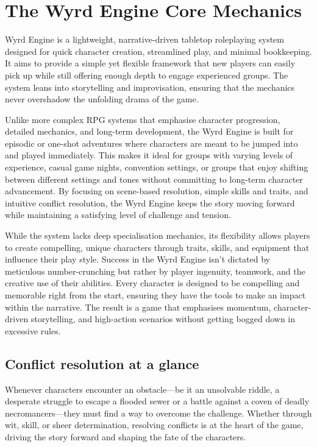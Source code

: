 \chapter{The Wyrd Engine Core Mechanics}

 Wyrd Engine is a lightweight, narrative-driven tabletop roleplaying system designed for quick character creation, streamlined play, and minimal bookkeeping. It aims to provide a simple yet flexible framework that new players can easily pick up while still offering enough depth to engage experienced groups. The system leans into storytelling and improvisation, ensuring that the mechanics never overshadow the unfolding drama of the game.

Unlike more complex RPG systems that emphasise character progression, detailed mechanics, and long-term development, the Wyrd Engine is built for episodic or one-shot adventures where characters are meant to be jumped into and played immediately. This makes it ideal for groups with varying levels of experience, casual game nights, convention settings, or groups that enjoy shifting between different settings and tones without committing to long-term character advancement. By focusing on scene-based resolution, simple skills and traits, and intuitive conflict resolution, the Wyrd Engine keeps the story moving forward while maintaining a satisfying level of challenge and tension.

While the system lacks deep specialisation mechanics, its flexibility allows players to create compelling, unique characters through traits, skills, and equipment that influence their play style. Success in the Wyrd Engine isn’t dictated by meticulous number-crunching but rather by player ingenuity, teamwork, and the creative use of their abilities. Every character is designed to be compelling and memorable right from the start, ensuring they have the tools to make an impact within the narrative. The result is a game that emphasises momentum, character-driven storytelling, and high-action scenarios without getting bogged down in excessive rules.

\section{Conflict resolution at a glance}

Whenever characters encounter an obstacle—be it an unsolvable riddle, a desperate struggle to escape a flooded sewer or a battle against a coven of deadly necromancers—they must find a way to overcome the challenge. Whether through wit, skill, or sheer determination, resolving conflicts is at the heart of the game, driving the story forward and shaping the fate of the characters.

